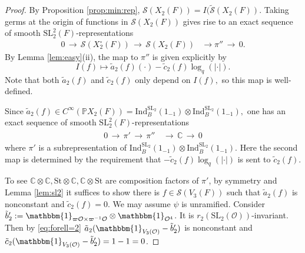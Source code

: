 \documentclass[11pt,a4paper,reqno]{amsart}
\theoremstyle{remark}
\numberwithin{equation}{section}
\newcommand{\SL}{\mathrm{SL}}
\newcommand{\lto}{\,\longrightarrow\,}
\newcommand{\OO}{\mathcal{O}}
\newcommand{\CC}{\mathbb{C}}
\theoremstyle{definition}
\numberwithin{equation}{section}
\newcommand{\one}{\mathbbm{1}}
\begin{document}
\begin{proof}
By Proposition \ref{prop:min:rep}, $\mathcal{S}(X_2(F))=I(\widetilde{\mathcal{S}}(X_2(F)).$ Taking germs at the origin of functions in $\mathcal{S}(X_{2}(F))$ gives rise to an exact sequence of smooth $\SL_2^2(F)$-representations
\begin{align}\label{eq:2exact}
    0\lto \mathcal{S}(X_{2}^\circ(F))\lto \mathcal{S}(X_{2}(F))&\longrightarrow \pi''\lto 0.
\end{align}
By Lemma \ref{lem:easy}(ii), the map to $\pi''$ is given explicitly by
$$
I(f) \longmapsto \tilde{a}_2(f)(\cdot)-\tilde{c}_2(f) \log_{q}(|\cdot|).
$$
Note that both $\tilde{a}_2(f)$ and $\tilde{c}_2(f)$ only depend on $I(f),$ so this map is well-defined. 

 Since $\tilde{a}_2(f) \in C^\infty(\mathbb{P}X_2(F))=\mathrm{Ind}_{B}^{\SL_2}(1_{-1})\otimes \mathrm{Ind}_{B}^{\SL_2}(1_{-1}), $ 
one has an exact sequence of smooth $\SL_2^2(F)$-representations
\begin{align} \label{no:split}
\begin{split}
    0\lto  \pi'\lto  \pi''&\lto \CC \lto 0
\end{split}
\end{align}
where $\pi'$ is a subrepresentation of $\mathrm{Ind}_{B}^{\SL_2}(1_{-1})\otimes \mathrm{Ind}_{B}^{\SL_2}(1_{-1}).$ 
Here the second map is determined by the requirement that $-\tilde{c}_2(f)\log_{q}(|\cdot|)$ is sent to $\tilde{c}_2(f).$ 

To see $\CC\otimes \CC, \mathrm{St}\otimes \CC, \CC\otimes \mathrm{St}$ are composition factors of $\pi'$, by symmetry and Lemma \ref{lem:sl2} it suffices to show there is $f\in \mathcal{S}(V_{3}(F))$ such that $\tilde{a}_2(f)$ is nonconstant and $\tilde{c}_2(f)=0.$ We may assume $\psi$ is unramified. Consider $\tilde{b}_2':= \one_{\varpi \OO\times \varpi^{-1}\OO}\otimes \one_{\OO^4}$. It is $r_{2}(\SL_2(\OO))$-invariant. Then by \eqref{eq:forell=2} $\tilde{a}_2(\one_{V_3(\OO)}-\tilde{b}_2')$ is nonconstant and $\tilde{c}_2(\one_{V_3(\OO)}-\tilde{b}_2')=1-1=0$. 


\end{proof}
\end{document}
